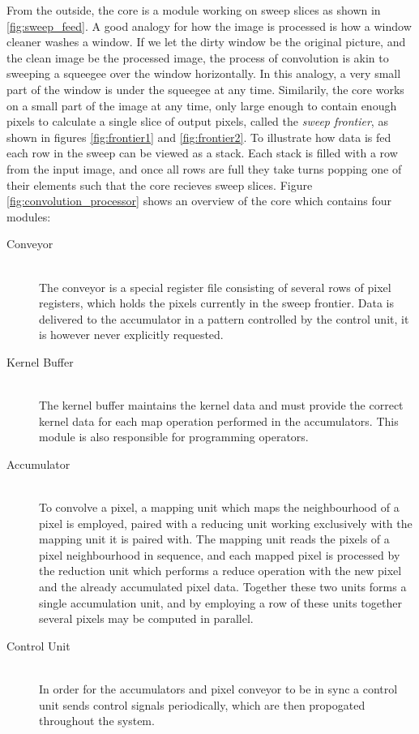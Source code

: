 From the outside, the core is a module working on sweep slices as shown in \ref{fig:sweep_feed}.
A good analogy for how the image is processed is how a window cleaner washes a window.
If we let the dirty window be the original picture, and the clean image be the processed image, the process of convolution is akin to sweeping a squeegee over the window horizontally.
In this analogy, a very small part of the window is under the squeegee at any time.
Similarily, the core works on a small part of the image at any time, only large enough to contain enough pixels to calculate a single slice of output pixels, called the \textit{sweep frontier}, as shown in figures \ref{fig:frontier1} and \ref{fig:frontier2}.
To illustrate how data is fed each row in the sweep can be viewed as a stack.
Each stack is filled with a row from the input image, and once all rows are full they take turns popping one of their elements such that the core recieves sweep slices.
Figure \ref{fig:convolution_processor} shows an overview of the core which contains four modules:

\begin{description}
    \item[Conveyor] \hfill\\ 
        The conveyor is a special register file consisting of several rows of pixel registers, which holds the pixels currently in the sweep frontier.
        Data is delivered to the accumulator in a pattern controlled by the control unit, it is however never explicitly requested.
    \item[Kernel Buffer] \hfill\\
        The kernel buffer maintains the kernel data and must provide the correct kernel data for each map operation performed in the accumulators.
        This module is also responsible for programming operators.
    \item[Accumulator] \hfill\\
        To convolve a pixel, a mapping unit which maps the neighbourhood of a pixel is employed, paired with a reducing unit working exclusively with the mapping unit it is paired with.
        The mapping unit reads the pixels of a pixel neighbourhood in sequence, and each mapped pixel is processed by the reduction unit which performs a reduce operation with the new pixel and the already accumulated pixel data.
        Together these two units forms a single accumulation unit, and by employing a row of these units together several pixels may be computed in parallel.
    \item[Control Unit] \hfill\\
        In order for the accumulators and pixel conveyor to be in sync a control unit sends control signals periodically, which are then propogated throughout the system.
\end{description}

